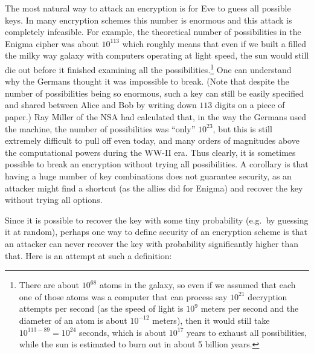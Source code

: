 The most natural way to attack an encryption is for Eve to guess all
possible keys. In many encryption schemes this number is enormous and
this attack is completely infeasible. For example, the theoretical
number of possibilities in the Enigma cipher was about \(10^{113}\)
which roughly means that even if we built a filled the milky way galaxy
with computers operating at light speed, the sun would still die out
before it finished examining all the possibilities.\footnote{There are
  about \(10^{68}\) atoms in the galaxy, so even if we assumed that each
  one of those atoms was a computer that can process say \(10^{21}\)
  decryption attempts per second (as the speed of light is \(10^9\)
  meters per second and the diameter of an atom is about \(10^{-12}\)
  meters), then it would still take \(10^{113-89} = 10^{24}\) seconds,
  which is about \(10^{17}\) years to exhaust all possibilities, while
  the sun is estimated to burn out in about 5 billion years.} One can
understand why the Germans thought it was impossible to break. (Note
that despite the number of possibilities being so enormous, such a key
can still be easily specified and shared between Alice and Bob by
writing down \(113\) digits on a piece of paper.) Ray Miller of the NSA
had calculated that, in the way the Germans used the machine, the number
of possibilities was ``only'' \(10^{23}\), but this is still extremely
difficult to pull off even today, and many orders of magnitudes above
the computational powers during the WW-II era. Thus clearly, it is
sometimes possible to break an encryption without trying all
possibilities. A corollary is that having a huge number of key
combinations does not guarantee security, as an attacker might find a
shortcut (as the allies did for Enigma) and recover the key without
trying all options.

Since it is possible to recover the key with some tiny probability
(e.g.~by guessing it at random), perhaps one way to define security of
an encryption scheme is that an attacker can never recover the key with
probability significantly higher than that. Here is an attempt at such a
definition:

\hypertarget{securefirstattemptdef}{}

